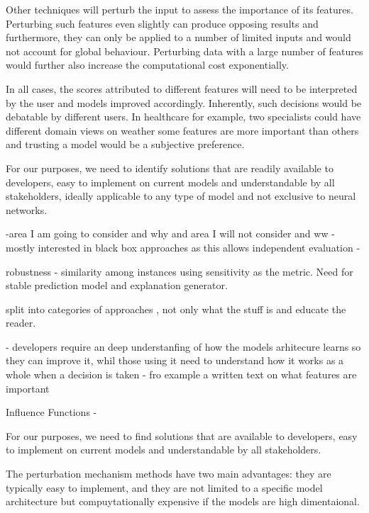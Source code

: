 \documentclass[proposal]{softeng}
\begin{document}
Other techniques will perturb the input to assess the importance of its features. Perturbing such features even slightly can produce opposing results and furthermore, they can only be applied to a number of limited inputs and would not account for global behaviour. Perturbing data with a large number of features would further also increase the computational cost exponentially.

In all cases, the scores attributed to different features will need to be interpreted by the user and models improved accordingly. Inherently, such decisions would be debatable by different users. In healthcare for example, two specialists could have different domain views on weather some features are more important than others and trusting a model would be a subjective preference.


For our purposes, we need to identify solutions that are readily available to developers, easy to implement on current models and understandable by all stakeholders, ideally applicable to any type of model and not exclusive to neural networks.




-area I am going to consider and why and area I will not consider and ww
- mostly interested in black box approaches as this allows independent evaluation
-


robustness - similarity among instances using sensitivity as the metric. Need for stable prediction model and explanation generator.


split into categories of approaches , not only what the stuff is and educate the reader.

- developers require an deep understanfing of how the models arhitecure learns so they can improve it, whil those using it need to understand how it works as a whole when a decision is taken - fro example a written text on what features are important 

Influence Functions -




For our purposes, we need to find solutions that are available to developers, easy to implement on current models and understandable by all stakeholders.

The perturbation mechanism methods have two main advantages: they are typically easy to implement, and they are not limited to a specific model architecture but compuytationally expensive if the models are high dimentaional.
\end{document}
